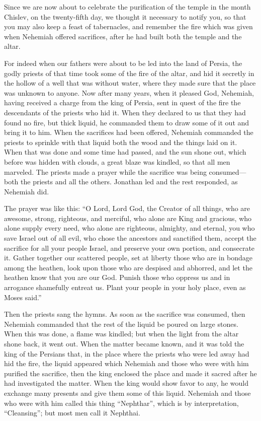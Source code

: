  Since we are now about to celebrate the purification of
the temple in the month Chislev, on the twenty-fifth day, we thought it
necessary to notify you, so that you may also keep a feast of
tabernacles, and remember the fire which was given when Nehemiah offered
sacrifices, after he had built both the temple and the altar.

 For indeed when our fathers were about to be led into the
land of Persia, the godly priests of that time took some of the fire of
the altar, and hid it secretly in the hollow of a well that was without
water, where they made sure that the place was unknown to anyone.
 Now after many years, when it pleased God, Nehemiah,
having received a charge from the king of Persia, sent in quest of the
fire the descendants of the priests who hid it. When they declared to us
that they had found no fire, but thick liquid,  he
commanded them to draw some of it out and bring it to him. When the
sacrifices had been offered, Nehemiah commanded the priests to sprinkle
with that liquid both the wood and the things laid on it. 
When that was done and some time had passed, and the sun shone out,
which before was hidden with clouds, a great blaze was kindled, so that
all men marveled.  The priests made a prayer while the
sacrifice was being consumed---both the priests and all the others.
Jonathan led and the rest responded, as Nehemiah did.

 The prayer was like this: ``O Lord, Lord God, the Creator
of all things, who are awesome, strong, righteous, and merciful, who
alone are King and gracious,  who alone supply every need,
who alone are righteous, almighty, and eternal, you who save Israel out
of all evil, who chose the ancestors and sanctified them, 
accept the sacrifice for all your people Israel, and preserve your own
portion, and consecrate it.  Gather together our scattered
people, set at liberty those who are in bondage among the heathen, look
upon those who are despised and abhorred, and let the heathen know that
you are our God.  Punish those who oppress us and in
arrogance shamefully entreat us.  Plant your people in your
holy place, even as Moses said.''

 Then the priests sang the hymns.  As soon as
the sacrifice was consumed, then Nehemiah commanded that the rest of the
liquid be poured on large stones.  When this was done, a
flame was kindled; but when the light from the altar shone back, it went
out.  When the matter became known, and it was told the
king of the Persians that, in the place where the priests who were led
away had hid the fire, the liquid appeared which Nehemiah and those who
were with him purified the sacrifice,  then the king
enclosed the place and made it sacred after he had investigated the
matter.  When the king would show favor to any, he would
exchange many presents and give them some of this liquid. 
Nehemiah and those who were with him called this thing ``Nephthar'',
which is by interpretation, ``Cleansing''; but most men call it
Nephthai.

